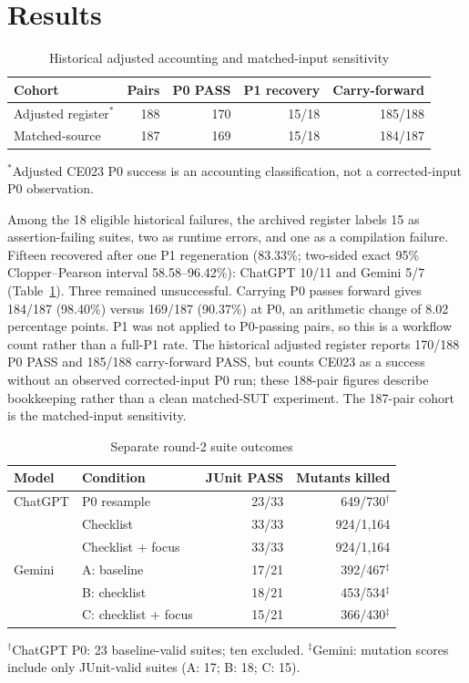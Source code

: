 \documentclass[conference]{IEEEtran}
\begin{document}
\section{Results}
\begin{table}[t]
\caption{Historical adjusted accounting and matched-input sensitivity}
\label{tab:hist}
\centering\scriptsize
\setlength{\tabcolsep}{2pt}
\begin{tabular}{@{}lrrrr@{}}
\toprule
Cohort & Pairs & P0 PASS & P1 recovery & Carry-forward \\
\midrule
Adjusted register$^*$ & 188 & 170 & 15/18 & 185/188 \\
Matched-source & 187 & 169 & 15/18 & 184/187 \\
\bottomrule
\end{tabular}
\par\raggedright\scriptsize $^*$Adjusted CE023 P0 success is an accounting classification, not a corrected-input P0 observation.
\end{table}

Among the 18 eligible historical failures, the archived register labels 15 as assertion-failing suites, two as runtime errors, and one as a compilation failure. Fifteen recovered after one P1 regeneration (83.33\%; two-sided exact 95\% Clopper--Pearson interval 58.58--96.42\%): ChatGPT 10/11 and Gemini 5/7 (Table~\ref{tab:hist}). Three remained unsuccessful. Carrying P0 passes forward gives 184/187 (98.40\%) versus 169/187 (90.37\%) at P0, an arithmetic change of 8.02 percentage points. P1 was not applied to P0-passing pairs, so this is a workflow count rather than a full-P1 rate. The historical adjusted register reports 170/188 P0 PASS and 185/188 carry-forward PASS, but counts CE023 as a success without an observed corrected-input P0 run; these 188-pair figures describe bookkeeping rather than a clean matched-SUT experiment. The 187-pair cohort is the matched-input sensitivity.
\begin{table}[t]
\caption{Separate round-2 suite outcomes}
\label{tab:r2}
\centering\scriptsize
\setlength{\tabcolsep}{3pt}
\begin{tabular}{@{}llrr@{}}
\toprule
Model & Condition & JUnit PASS & Mutants killed \\
\midrule
ChatGPT & P0 resample & 23/33 & 649/730$^\dagger$ \\
 & Checklist & 33/33 & 924/1,164 \\
 & Checklist + focus & 33/33 & 924/1,164 \\
\midrule
Gemini & A: baseline & 17/21 & 392/467$^{\ddagger}$ \\
 & B: checklist & 18/21 & 453/534$^{\ddagger}$ \\
 & C: checklist + focus & 15/21 & 366/430$^{\ddagger}$ \\
\bottomrule
\end{tabular}
\par\raggedright\scriptsize $^\dagger$ChatGPT P0: 23 baseline-valid suites; ten excluded. $^\ddagger$Gemini: mutation scores include only JUnit-valid suites (A: 17; B: 18; C: 15).
\end{table}
\end{document}
